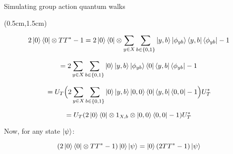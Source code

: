 \documentclass{beamer}
\theoremstyle{definition}
\begin{document}
\begin{frame}{Simulating group action quantum walks}
    
    \begin{textblock*}{12cm}(0.5cm,1.5cm)

            
        

        \[
        2\ket{0} \bra{0} \otimes TT^* - 1 = 2\ket{0} \bra{0} \otimes \sum_{y \in X} \sum_{b \in \{0, 1\}} \ket{y, b} \ket{\phi_{yb}} \bra{y, b} \bra{\phi_{yb}} - 1 
        \]

        \[
        = 2\sum_{y \in X} \sum_{b \in \{0, 1\}} \ket{0} \ket{y, b} \ket{\phi_{yb}} \bra{0} \bra{y, b} \bra{\phi_{yb}} - 1 
        \]

        \[
        = U_T \Big( 2\sum_{y \in X} \sum_{b \in \{0, 1\}} \ket{0} \ket{y, b} \ket{0, 0} \bra{0} \bra{y, b} \bra{0, 0} - 1 \Big) U_T^* 
        \]

        \[
        = U_T (2 \ket{0} \bra{0} \otimes 1_{X, b} \otimes \ket{0, 0} \bra{0, 0} - 1) U_T^*
        \]

        Now, for any state $\ket{\psi}$:

        \[
        (2\ket{0}\bra{0}\otimes TT^* - 1)\ket{0}\ket{\psi} = \ket{0}(2TT^*-1)\ket{\psi}
        \]

    \end{textblock*}

\end{frame}
\end{document}
